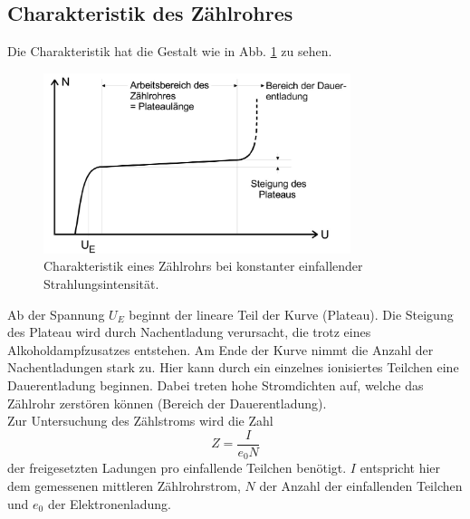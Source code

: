 \subsection{Charakteristik des Zählrohres}
Die Charakteristik hat die Gestalt wie in Abb. \ref{fig:charakteristik} zu sehen.
\begin{figure}
    \centering
    \includegraphics[width=0.8\textwidth]{content/data/charakteristik.jpg}
    \caption{Charakteristik eines Zählrohrs bei konstanter einfallender Strahlungsintensität. \cite[5]{anleitung}}
    \label{fig:charakteristik}
\end{figure}
Ab der Spannung $U_E$ beginnt der lineare Teil der Kurve (Plateau).
Die Steigung des Plateau wird durch Nachentladung verursacht, die trotz eines Alkoholdampfzusatzes entstehen.
Am Ende der Kurve nimmt die Anzahl der Nachentladungen stark zu.
Hier kann durch ein einzelnes ionisiertes Teilchen eine Dauerentladung beginnen.
Dabei treten hohe Stromdichten auf, welche das Zählrohr zerstören können (Bereich der Dauerentladung).
\\
Zur Untersuchung des Zählstroms wird die Zahl
\begin{equation}
    Z = \frac{I}{e_0 N}
    \label{eqn:}
\end{equation}
der freigesetzten Ladungen pro einfallende Teilchen benötigt.
$I$ entspricht hier dem gemessenen mittleren Zählrohrstrom, $N$ der Anzahl der einfallenden Teilchen und $e_0$ der Elektronenladung.